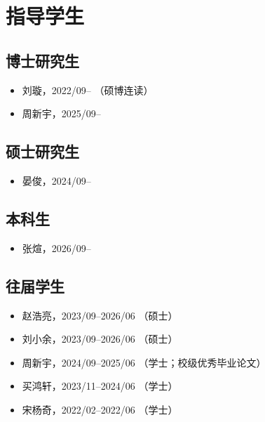 \section{指导学生}

\subsection{博士研究生}
\begin{itemize}
\item 刘璇，2022/09-- （硕博连读）
\item 周新宇，2025/09--
\end{itemize}

\subsection{硕士研究生}
\begin{itemize}
\item 晏俊，2024/09--
\end{itemize}

\subsection{本科生}
\begin{itemize}
\item 张煊，2026/09--
\end{itemize}

\subsection{往届学生}
\begin{itemize}
\item 赵浩亮，2023/09--2026/06 （硕士）
\item 刘小余，2023/09--2026/06 （硕士）
\item 周新宇，2024/09--2025/06 （学士；校级优秀毕业论文）
\item 买鸿轩，2023/11--2024/06 （学士）
\item 宋杨奇，2022/02--2022/06 （学士）
\end{itemize}
